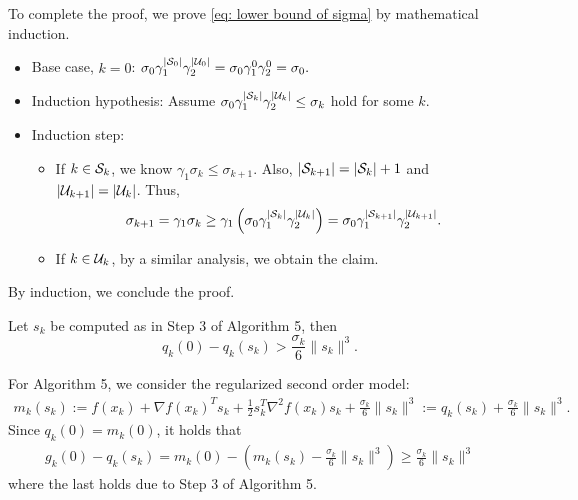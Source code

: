 \documentclass{ExerciseSheet}
\newif\ifsolutions
\begin{document}
\begin{solution}
    To complete the proof, we prove \eqref{eq: lower bound of sigma} by mathematical induction. 
    \begin{itemize}
        \item Base case, $k=0$: $\sigma_0\gamma_1^{|{\mathcal S}_0|}\gamma_2^{|{\mathcal U}_0|}=\sigma_0\gamma_1^0\gamma_2^0=\sigma_0.$
        \item Induction hypothesis: Assume $\sigma_0\gamma_1^{|{\mathcal S}_k|}\gamma_2^{|{\mathcal U}_k|}\leq \sigma_k$ hold for some $k$.
        \item Induction step:
            \begin{itemize}
                \item If $k\in{\mathcal S}_k$, we know $\gamma_1\sigma_k \leq \sigma_{k+1}$. Also, $|{\mathcal S}_{k+1}|=|{\mathcal S}_k|+1$ and $|{\mathcal U}_{k+1}|=|{\mathcal U}_k|$. Thus,
                \begin{align*}
                    \sigma_{k+1} = \gamma_1\sigma_k \geq \gamma_1\left(\sigma_0\gamma_1^{|{\mathcal S}_k|}\gamma_2^{|{\mathcal U}_k|}\right) = \sigma_0\gamma_1^{|{\mathcal S}_{k+1}|}\gamma_2^{|{\mathcal U}_{k+1}|}.
                \end{align*}
                \item If $k\in{\mathcal U}_k$, by a similar analysis, we obtain the claim.
            \end{itemize}
            
    \end{itemize}
    By induction, we conclude the proof.
\end{solution}

\fi



\vskip 0.5cm

\begin{problem}
  Let $s_k$ be computed as in Step 3 of Algorithm 5, then
	\begin{equation*}
		q_k(0)- q_k(s_k) > \frac{\sigma_k}{6} \|s_k\|^3.
	\end{equation*}
\end{problem}

\ifsolutions
\vskip 0.3cm

\begin{solution}
    For Algorithm 5, we consider the regularized second order model:
    \begin{align*}
        m_k(s_k):=f(x_k)+\nabla f(x_k)^Ts_k+\frac{1}{2}s_k^T\nabla^2f(x_k)s_k+\frac{\sigma_k}{6}\lVert s_k\rVert^3 := q_k(s_k)+\frac{\sigma_k}{6}\lVert s_k\rVert^3.
    \end{align*}
    Since $q_k(0)=m_k(0)$, it holds that 
    \begin{align*}
        g_k(0)-q_k(s_k)=m_k(0)-\left(m_k(s_k)-\frac{\sigma_k}{6}\lVert s_k\rVert^3\right)\geq \frac{\sigma_k}{6}\lVert s_k\rVert^3
    \end{align*}
    where the last holds due to Step 3 of Algorithm 5.
\end{solution}
\end{document}
